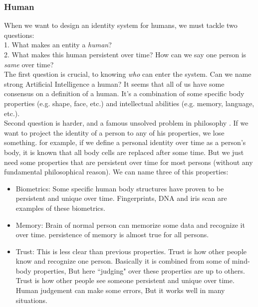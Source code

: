 \documentclass[conference]{IEEEtran}
\begin{document}
\subsubsection{Human}
When we want to design an identity system for humans, we must tackle two questions:
\\
1. What makes an entity a \textit{human}?
\\
2. What makes this human persistent over time? How can we say one person is \textit{same} over time?
\\
The first question is crucial, to knowing \textit{who} can enter the system. Can we name strong Artificial Intelligence a human? It seems that all of us have some consensus on a definition of a human. It's a combination of some specific body properties (e.g. shape, face, etc.) and intellectual abilities (e.g. memory, language, etc.). 
\\
Second question is harder, and a famous unsolved problem in philosophy \cite{identity-personal}. If we want to project the identity of a person to any of his properties, we lose something. for example, if we define a personal identity over time as a person's body, it is known that all body cells are replaced after some time. But we just need some properties that are persistent over time for most persons (without any fundamental philosophical reason). We can name three of this properties: 
\begin{itemize}
\item{Biometrics:}
Some specific human body structures have proven to be persistent and unique over time. Fingerprints, DNA and iris scan are examples of these biometrics.
\item{Memory:}
Brain of normal person can memorize some data and recognize it over time. persistence of memory is almost true for all persons.
\item{Trust:}
This is less clear than previous properties. Trust is how other people know and recognize one person. Basically it is combined from some of mind-body properties, But here ``judging" over these properties are up to others. Trust is how other people see someone persistent and unique over time. Human judgement can make some errors, But it works well in many situations.
\end{itemize}
\end{document}
